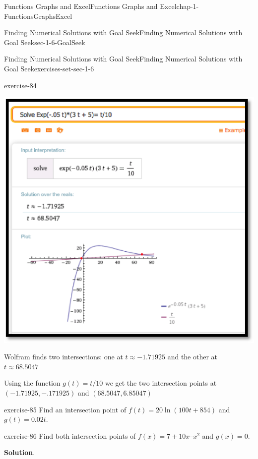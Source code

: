 \documentclass[oneside,10pt,]{book}
\numberwithin{equation}{section}
\begin{document}
\begin{chapterptx}{Functions Graphs and Excel}{}{Functions Graphs and Excel}{}{}{chap-1-FunctionsGraphsExcel}
\begin{sectionptx}{Finding Numerical Solutions with Goal Seek}{}{Finding Numerical Solutions with Goal Seek}{}{}{sec-1-6-GoalSeek}
\begin{exercises-subsection-numberless}{Finding Numerical Solutions with Goal Seek}{}{Finding Numerical Solutions with Goal Seek}{}{}{exercises-set-sec-1-6}
\begin{divisionexercise}{9}{}{}{exercise-84}
\begin{sidebyside}{1}{0}{0}{0}
\begin{sbspanel}{1}
\includegraphics[width=1\linewidth]{images/sec1-6-sol9a.png}
\end{sbspanel}%
\end{sidebyside}%
 Wolfram finds two intersections: one at \(t\approx-1.71925\) and the other at \(t\approx68.5047\)%
\par
\hypertarget{p-520}{}%
Using the function \(g(t)=t/10\) we get the two intersection points at \((-1.71925,-.171925)\) and \((68.5047,6.85047)\)%
\end{divisionexercise}%
\begin{divisionexercise}{10}{}{}{exercise-85}%
\hypertarget{p-521}{}%
Find an intersection point of \(f(t) = 20 \ln(100 t + 854)\) and \(g(t) = 0.02 t\).%
\end{divisionexercise}%
\begin{divisionexercise}{11}{}{}{exercise-86}%
\hypertarget{p-522}{}%
Find both intersection points of \(f(x) = 7 + 10 x – x^2\) and \(g(x) = 0\).%
\par\smallskip%
\noindent\textbf{Solution}.\hypertarget{solution-41}{}\quad%
\hypertarget{p-523}{}%
\leavevmode%
\begin{sidebyside}{1}{0.2}{0.2}{0}%
\begin{sbspanel}{0.6}%

\end{sbspanel}
\end{sidebyside}
\end{divisionexercise}
\end{exercises-subsection-numberless}
\end{sectionptx}
\end{chapterptx}
\end{document}
